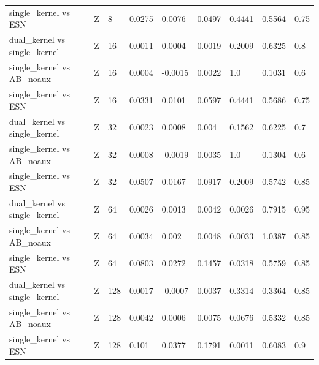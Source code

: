\begin{table}
\begin{ruledtabular}
\begin{tabular}{lllllllll}
single_kernel vs ESN & Z & 8 & 0.0275 & 0.0076 & 0.0497 & 0.4441 & 0.5564 & 0.75 \\
dual_kernel vs single_kernel & Z & 16 & 0.0011 & 0.0004 & 0.0019 & 0.2009 & 0.6325 & 0.8 \\
single_kernel vs AB_noaux & Z & 16 & 0.0004 & -0.0015 & 0.0022 & 1.0 & 0.1031 & 0.6 \\
single_kernel vs ESN & Z & 16 & 0.0331 & 0.0101 & 0.0597 & 0.4441 & 0.5686 & 0.75 \\
dual_kernel vs single_kernel & Z & 32 & 0.0023 & 0.0008 & 0.004 & 0.1562 & 0.6225 & 0.7 \\
single_kernel vs AB_noaux & Z & 32 & 0.0008 & -0.0019 & 0.0035 & 1.0 & 0.1304 & 0.6 \\
single_kernel vs ESN & Z & 32 & 0.0507 & 0.0167 & 0.0917 & 0.2009 & 0.5742 & 0.85 \\
dual_kernel vs single_kernel & Z & 64 & 0.0026 & 0.0013 & 0.0042 & 0.0026 & 0.7915 & 0.95 \\
single_kernel vs AB_noaux & Z & 64 & 0.0034 & 0.002 & 0.0048 & 0.0033 & 1.0387 & 0.85 \\
single_kernel vs ESN & Z & 64 & 0.0803 & 0.0272 & 0.1457 & 0.0318 & 0.5759 & 0.85 \\
dual_kernel vs single_kernel & Z & 128 & 0.0017 & -0.0007 & 0.0037 & 0.3314 & 0.3364 & 0.85 \\
single_kernel vs AB_noaux & Z & 128 & 0.0042 & 0.0006 & 0.0075 & 0.0676 & 0.5332 & 0.85 \\
single_kernel vs ESN & Z & 128 & 0.101 & 0.0377 & 0.1791 & 0.0011 & 0.6083 & 0.9 \\
\end{tabular}
\end{ruledtabular}
\end{table}